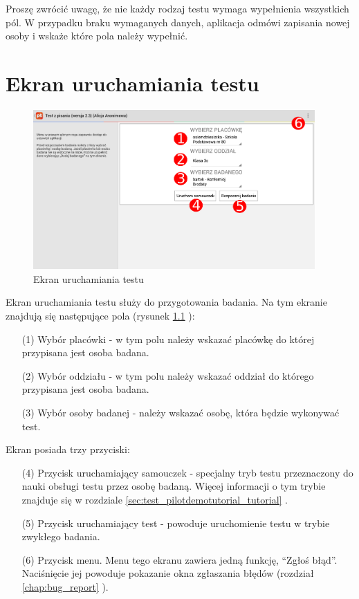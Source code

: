 \documentclass[a4paper,10pt,twosided]{book}
\newcommand{\refwithpage}[3]{
\ref{#1}\ifthenelse{\equal{\thepage}{\pageref{#1}}}{}{#2\pageref{#1}#3}%
}
\newcommand{\pref}[1]{\refwithpage{#1}{ (strona }{)}}
\newcommand{\ppref}[1]{\refwithpage{#1}{ -- strona }{}}
\begin{document}
Proszę zwrócić uwagę, że nie każdy rodzaj testu wymaga wypełnienia wszystkich pól. W przypadku braku wymaganych danych, aplikacja odmówi zapisania nowej osoby i wskaże które pola należy wypełnić.

\chapter{Ekran uruchamiania testu}
\label{chap:runtest}

\begin{figure}[b!]
\includegraphics[width=0.96\textwidth]{activity_test_config.pdf}
\caption{Ekran uruchamiania testu}
\label{fig:runtest}
\end{figure}

Ekran uruchamiania testu służy do przygotowania badania. Na tym ekranie znajdują się następujące pola (rysunek \ppref{fig:runtest}):

\begin{enumerate}
\item[(1)] Wybór placówki - w tym polu należy wskazać placówkę do której przypisana jest osoba badana.
\item[(2)] Wybór oddziału - w tym polu należy wskazać oddział do którego przypisana jest osoba badana.
\item[(3)] Wybór osoby badanej - należy wskazać osobę, która będzie wykonywać test.
\end{enumerate}

Ekran posiada trzy przyciski:

\begin{enumerate}
\item[(4)] Przycisk uruchamiający samouczek - specjalny tryb testu przeznaczony do nauki obsługi testu przez osobę badaną. Więcej informacji o tym trybie znajduje się w rozdziale \pref{sec:test_pilotdemotutorial_tutorial}.
\item[(5)] Przycisk uruchamiający test - powoduje uruchomienie testu w trybie zwykłego badania.
\item[(6)] Przycisk menu. Menu tego ekranu zawiera jedną funkcję, ``Zgłoś błąd''. Naciśnięcie jej powoduje pokazanie okna zgłaszania błędów (rozdział \ppref{chap:bug_report}).
\end{enumerate}
\end{document}
